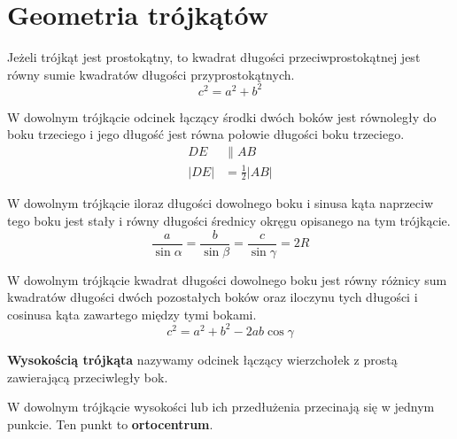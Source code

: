     \section{Geometria trójkątów}
      \begin{theorem}
        Jeżeli trójkąt jest prostokątny, to kwadrat długości przeciwprostokątnej jest równy sumie kwadratów długości przyprostokątnych.
        \begin{equation}
          c^2 = a^2 + b^2
        \end{equation}
      \end{theorem}
      \begin{theorem}
        W dowolnym trójkącie odcinek łączący środki dwóch boków jest równoległy do boku trzeciego i jego długość jest równa połowie długości boku trzeciego.
        \begin{equation}
          \begin{aligned}
            DE &\parallel AB\\
            |DE| &= \frac 12|AB|
          \end{aligned}
        \end{equation}
      \end{theorem}
      \begin{theorem}
        W dowolnym trójkącie iloraz długości dowolnego boku i sinusa kąta naprzeciw tego boku jest stały i równy długości średnicy okręgu opisanego na tym trójkącie.
        \begin{equation}
          \frac{a}{\sin\alpha} = \frac{b}{\sin\beta} = \frac{c}{\sin\gamma} = 2R
        \end{equation}
      \end{theorem}
      \begin{theorem}
        W dowolnym trójkącie kwadrat długości dowolnego boku jest równy różnicy sum kwadratów długości dwóch pozostałych boków oraz iloczynu tych długości i cosinusa kąta zawartego między tymi bokami.
        \begin{equation}
          c^2 = a^2 + b^2 - 2ab\cos\gamma
        \end{equation}
      \end{theorem}
      \begin{definition}
        \textbf{Wysokością trójkąta} nazywamy odcinek łączący wierzchołek z prostą zawierającą przeciwległy bok.
      \end{definition}
      \begin{theorem}
        W dowolnym trójkącie wysokości lub ich przedłużenia przecinają się w jednym punkcie. Ten punkt to \textbf{ortocentrum}.
      \end{theorem}
